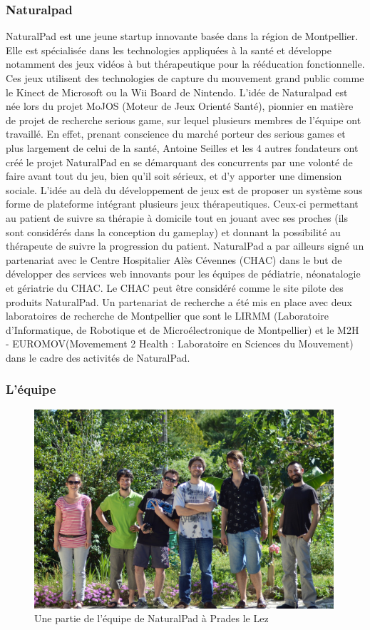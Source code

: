 	\subsubsection{Naturalpad}
NaturalPad est une jeune startup innovante basée dans la région de Montpellier. Elle est spécialisée dans les technologies appliquées à la santé et développe notamment des jeux vidéos à but thérapeutique pour la rééducation fonctionnelle. Ces jeux utilisent des technologies de capture du mouvement grand public comme le Kinect de Microsoft ou la Wii Board de Nintendo. L’idée de Naturalpad est née lors du projet MoJOS (Moteur de Jeux Orienté Santé), pionnier en matière de projet de recherche serious game, sur lequel plusieurs membres de l’équipe ont travaillé. En effet, prenant conscience du marché porteur des serious games et plus largement de celui de la santé, Antoine Seilles et les 4 autres fondateurs ont créé le projet NaturalPad en se démarquant des concurrents par une volonté de faire avant tout du jeu, bien qu’il soit sérieux, et d’y apporter une dimension sociale. L’idée au delà du développement de jeux est de proposer un système sous forme de plateforme intégrant plusieurs jeux thérapeutiques. Ceux-ci permettant au patient de suivre sa thérapie à domicile tout en jouant avec ses proches (ils sont considérés dans la conception du gameplay) et donnant la possibilité au thérapeute de suivre la progression du patient. NaturalPad a par ailleurs signé un partenariat avec le Centre Hospitalier Alès Cévennes (CHAC) dans le but de développer des services web innovants pour les équipes de pédiatrie, néonatalogie et gériatrie du CHAC. Le CHAC peut être considéré comme le site pilote des produits NaturalPad. Un partenariat de recherche a été mis en place avec deux laboratoires de recherche de Montpellier que sont le LIRMM (Laboratoire d’Informatique, de Robotique et de Microélectronique de Montpellier) et le M2H - EUROMOV(Movemement 2 Health : Laboratoire en Sciences du Mouvement) dans le cadre des activités de NaturalPad.

	\subsubsection{L'équipe}
	\begin{figure}[!h] 
		\centering
		\includegraphics[width=420px]{images/naturalpad_groupe.jpg}
		\caption{Une partie de l'équipe de NaturalPad à Prades le Lez}
		\label{naturalpad_groupe}
	\end{figure}
	
